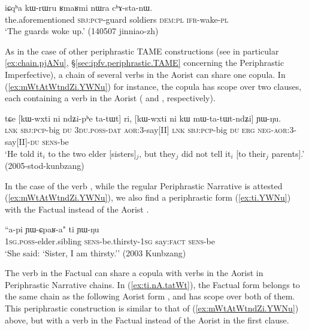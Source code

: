 \begin{exe}
\ex \label{ex:chAstanW}
\gll iɕqʰa kɯ-rɯru ʁmaʁmi nɯra cʰɤ-sta-nɯ. \\
the.aforementioned \textsc{sbj}:\textsc{pcp}-guard soldiers \textsc{dem}:\textsc{pl} \textsc{ifr}-wake-\textsc{pl} \\
\glt `The guards woke up.' (140507 jinniao-zh)
\end{exe}

As in the case of other periphrastic TAME constructions (see in particular \ref{ex:chain.pjANu}, §\ref{sec:ipfv.periphrastic.TAME} concerning the Periphrastic Imperfective), a chain of several verbs in the Aorist can share one copula. In (\ref{ex:mWtAtWtndZi.YWNu}) for instance, the copula  has scope over two clauses, each containing a verb in the Aorist ( and , respectively).

\begin{exe}
\ex \label{ex:mWtAtWtndZi.YWNu}
\gll tɕe [kɯ-wxti ni ndʑi-pʰe ta-tɯt] ri, [kɯ-wxti ni kɯ mɯ-ta-tɯt-ndʑi] ɲɯ-ŋu. \\
\textsc{lnk} \textsc{sbj}:\textsc{pcp}-big \textsc{du} \textsc{3du}.\textsc{poss}-\textsc{dat} \textsc{aor}:3\flobv{}-say[II] \textsc{lnk} \textsc{sbj}:\textsc{pcp}-big \textsc{du} \textsc{erg} \textsc{neg}-\textsc{aor}:3\flobv{}-say[II]-\textsc{du} \textsc{sens}-be \\
\glt `He told it$_i$ to the two elder [sisters]$_j$, but they$_j$ did not tell it$_i$ [to their$_j$ parents].' (2005-stod-kunbzang)
\end{exe}

In the case of the verb , while the regular Periphrastic Narrative is attested (\ref{ex:mWtAtWtndZi.YWNu}), we also find a periphrastic form  (\ref{ex:ti.YWNu}) with the Factual  instead of the Aorist .

\begin{exe}
\ex \label{ex:ti.YWNu}
\gll ``a-pi ɲɯ-ɕpaʁ-a" ti ɲɯ-ŋu \\
\textsc{1sg}.\textsc{poss}-elder.sibling \textsc{sens}-be.thirsty-\textsc{1sg} say:\textsc{fact} \textsc{sens}-be \\
\glt `She said: `Sister, I am thirsty.'' (2003 Kunbzang)
\end{exe}

The verb  in the Factual can share a copula with verbs in the Aorist in Periphrastic Narrative chains. In (\ref{ex:ti.nA.tatWt}), the Factual form  belongs to the same chain as the following Aorist form , and  has scope over both of them. This periphrastic construction is similar to that of (\ref{ex:mWtAtWtndZi.YWNu}) above, but with a verb in the Factual instead of the Aorist in the first clause.

